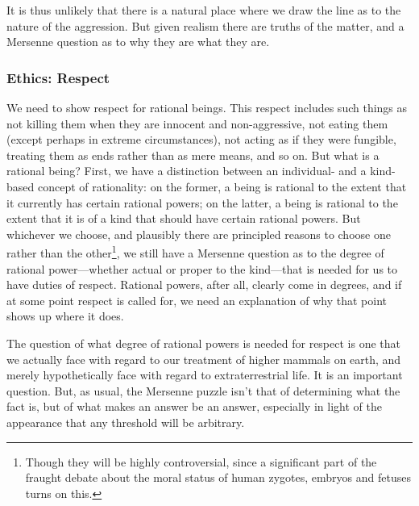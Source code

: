 It is thus unlikely that there is a natural place where we draw the line as to the nature of the aggression. But given realism there are
truths of the matter, and a Mersenne question as to why they are what they are.

\subsubsection{Ethics: Respect}
We need to show respect for rational beings. This respect includes such things as not killing them when they are
innocent and non-aggressive, not eating them (except perhaps in extreme circumstances), not acting as if they were fungible, treating them as ends rather than as
mere means, and so on. But what is a rational being? First, we have a distinction between an individual- and a 
kind-based
concept of rationality: on the former, a being is rational to the extent that it currently has certain rational powers;
on the latter, a being is rational to the extent that it is of a kind that should have certain rational powers. But whichever we choose, and
plausibly there are principled reasons to choose one rather than the other\footnote{Though they will be highly controversial, since 
a significant part of the fraught debate about the moral status of human zygotes, embryos and fetuses turns on this.}, 
we still have a Mersenne question as to the degree of rational power---whether actual or proper to the kind---that is 
needed for us to have duties of respect. Rational powers, after all, clearly come in degrees, and if at some point respect
is called for, we need an explanation of why that point shows up where it does.

The question of what degree of rational powers is needed for respect is one that we actually face with regard to our treatment
of higher mammals on earth, and merely hypothetically face with regard to extraterrestrial life. 
It is an important question. But, as usual, the Mersenne puzzle isn't that of determining what the fact is, but of what makes 
an answer be an answer, especially in light of the appearance that any threshold will be arbitrary.

